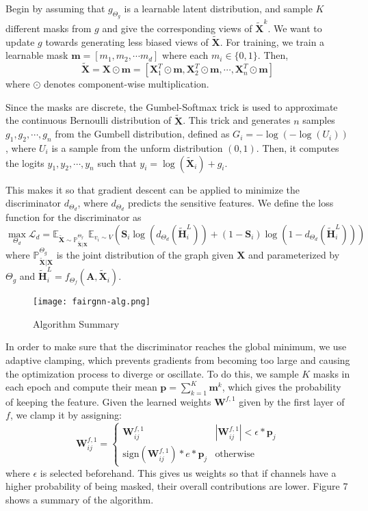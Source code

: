 \documentclass[final]{article}
\begin{document}
Begin by assuming that $g_{\Theta_g}$ is a learnable latent distribution, and sample $K$ different masks from $g$ and give the corresponding views of $\tilde{\textbf{X}}^k$. We want to update $g$ towards generating less biased views of $\tilde{\textbf{X}}$. For training, we train a learnable mask $\textbf{m} = [m_1, m_2, \cdots m_d]$ where each $m_i \in \{ 0, 1\}$. Then, 
$$\tilde{\textbf{X}} = \textbf{X} \odot \textbf{m} = [\textbf{X}_1^T \odot \textbf{m}, \textbf{X}_2^T \odot \textbf{m}, \cdots, \textbf{X}_n^T \odot \textbf{m}] $$
where $\odot$ denotes component-wise multiplication. 

Since the masks are discrete, the Gumbel-Softmax trick is used to approximate the continuous Bernoulli distribution of $\tilde{\textbf{X}}$. This trick and generates $n$ samples $g_1, g_2, \cdots, g_n$ from the Gumbell distribution, defined as $G_i = -\log(-\log(U_i))$, where $U_i$ is a sample from the unform distribution $(0, 1)$. Then, it computes the logits $y_1, y_2, \cdots, y_n$ such that $y_i = \log(\tilde{\textbf{X}}_i) + g_i$. 

This makes it so that gradient descent can be applied to minimize the discriminator $d_{\Theta_d}$, where $d_{\Theta_d}$ predicts the sensitive features. We define the loss function for the discriminator as 
$$\underset{\Theta_d}{\max}\mathcal{L}_d = \mathbb{E}_{\tilde{\textbf{X}} \sim \mathbb{P}^{\Theta_g}_{\tilde{\textbf{X}}|\textbf{X}}}\mathbb{E}_{v_i \sim V}( \textbf{S}_i \log (d_{\Theta_d} (\tilde{\textbf{H}}_i^L)) + (1 - \textbf{S}_i)\log(1-d_{\Theta_d} (\tilde{\textbf{H}}_i^L)))$$
where $\mathbb{P}^{\Theta_g}_{\tilde{\textbf{X}}|\textbf{X}}$ is the joint distribution of the graph given $\textbf{X}$ and parameterized by $\Theta_g$ and $\tilde{\textbf{H}}_i^L = f_{\Theta_f}(\textbf{A}, \tilde{\textbf{X}}_i)$. 

\begin{figure}[t]
  \centering
 \texttt{[image: fairgnn-alg.png]}
  \caption{Algorithm Summary}
 \end{figure}

 
In order to make sure that the discriminator reaches the global minimum, we use adaptive clamping, which prevents gradients from becoming too large and causing the optimization process to diverge or oscillate. To do this, we sample $K$ masks in each epoch and compute their mean $\textbf{p} = \sum_{k=1}^K\textbf{m}^k$, which gives the probability of keeping the feature. Given the learned weights $\textbf{W}^{f, 1}$ given by the first layer of $f$, we clamp it by assigning: 
$$\textbf{W}^{f, 1}_{ij} = 
\begin{cases}
\textbf{W}^{f, 1}_{ij} & |\textbf{W}^{f, 1}_{ij}| < \epsilon * \textbf{p}_j \\
\text{sign}(\textbf{W}^{f, 1}_{ij})*e*\textbf{p}_j & \text{otherwise}
\end{cases}$$
where $\epsilon$ is selected beforehand. This gives us weights so that if channels have a higher probability of being masked, their overall contributions are lower. Figure 7 shows a summary of the algorithm. 
\end{document}
